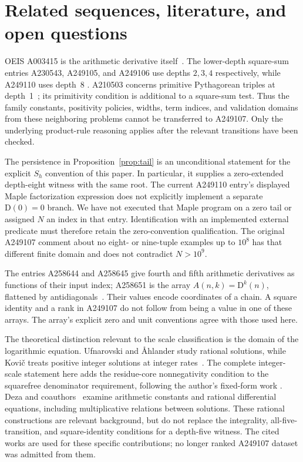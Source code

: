 \documentclass[11pt,a4paper]{article}
\newcommand{\D}{\mathrm{D}}
\theoremstyle{definition}
\theoremstyle{remark}
\begin{document}
\section{Related sequences, literature, and open questions}\label{sec:context}

OEIS A003415 is the arithmetic derivative itself~\cite{derivativeentry}.
The lower-depth square-sum entries A230543, A249105, and A249106 use
depths $2,3,4$ respectively, while A249110 uses depth~8
\cite{depthentries}. A210503 concerns primitive Pythagorean triples at
depth~1~\cite{triples}; its primitivity condition is additional to a
square-sum test. Thus the family constants, positivity policies, widths,
term indices, and validation domains from these neighboring problems
cannot be transferred to A249107. Only the underlying product-rule
reasoning applies after the relevant transitions have been checked.

The persistence in Proposition~\ref{prop:tail} is an unconditional
statement for the explicit $S_h$ convention of this paper. In particular,
it supplies a zero-extended depth-eight witness with the same root.
The current A249110 entry's displayed Maple factorization expression
does not explicitly implement a separate $\D(0)=0$ branch. We have not
executed that Maple program on a zero tail or assigned $N$ an index in
that entry. Identification with an implemented external predicate must
therefore retain the zero-convention qualification. The original A249107
comment about no eight- or nine-tuple examples up to $10^8$ has that
different finite domain and does not contradict $N>10^9$.

The entries A258644 and A258645 give fourth and fifth arithmetic
derivatives as functions of their input index; A258651 is the array
$A(n,k)=\D^k(n)$, flattened by antidiagonals~\cite{arrayentries}.
Their values encode coordinates of a chain. A square identity and a
rank in A249107 do not follow from being a value in one of these arrays.
The array's explicit zero and unit conventions agree with those used here.

The theoretical distinction relevant to the scale classification is the
domain of the logarithmic equation. Ufnarovski and \AA hlander study
rational solutions, while Kovi\v{c} treats positive integer solutions at
integer rates~\cite{ufnarovski,kovic}. The complete integer-scale statement
here adds the residue-core nonnegativity condition to the squarefree
denominator requirement, following the author's fixed-form work
\cite{corti230543,corti249105}. Deza and coauthors~\cite{deza} examine
arithmetic constants and rational differential equations, including
multiplicative relations between solutions. These rational constructions
are relevant background, but do not replace the integrality, all-five-
transition, and square-identity conditions for a depth-five witness.
The cited works are used for these specific contributions; no longer
ranked A249107 dataset was admitted from them.
\end{document}
